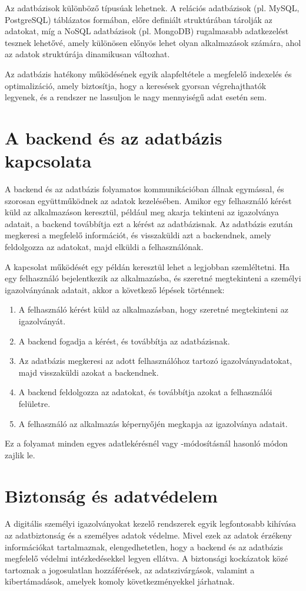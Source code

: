 \documentclass[
]{thesis-ekf}
\theoremstyle{definition}
\theoremstyle{remark}
\begin{document}
	Az adatbázisok különböző típusúak lehetnek. A relációs adatbázisok (pl. MySQL, PostgreSQL) táblázatos formában, előre definiált struktúrában tárolják az adatokat, míg a NoSQL adatbázisok (pl. MongoDB) rugalmasabb adatkezelést tesznek lehetővé, amely különösen előnyös lehet olyan alkalmazások számára, ahol az adatok struktúrája dinamikusan változhat.
	
	Az adatbázis hatékony működésének egyik alapfeltétele a megfelelő indexelés és optimalizáció, amely biztosítja, hogy a keresések gyorsan végrehajthatók legyenek, és a rendszer ne lassuljon le nagy mennyiségű adat esetén sem.
	\section{A backend és az adatbázis kapcsolata}
	A backend és az adatbázis folyamatos kommunikációban állnak egymással, és szorosan együttműködnek az adatok kezelésében. Amikor egy felhasználó kérést küld az alkalmazáson keresztül, például meg akarja tekinteni az igazolványa adatait, a backend továbbítja ezt a kérést az adatbázisnak. Az adatbázis ezután megkeresi a megfelelő információt, és visszaküldi azt a backendnek, amely feldolgozza az adatokat, majd elküldi a felhasználónak.
	
	A kapcsolat működését egy példán keresztül lehet a legjobban szemléltetni. Ha egy felhasználó bejelentkezik az alkalmazásba, és szeretné megtekinteni a személyi igazolványának adatait, akkor a következő lépések történnek:
	
	
	\begin{enumerate}
		\item 	A felhasználó kérést küld az alkalmazásban, hogy szeretné megtekinteni az igazolványát.
		\item 	A backend fogadja a kérést, és továbbítja az adatbázisnak.
		\item 	Az adatbázis megkeresi az adott felhasználóhoz tartozó igazolványadatokat, majd visszaküldi azokat a backendnek.
		\item 	A backend feldolgozza az adatokat, és továbbítja azokat a felhasználói felületre.
		\item 	A felhasználó az alkalmazás képernyőjén megkapja az igazolványa adatait.
	\end{enumerate}
	Ez a folyamat minden egyes adatlekérésnél vagy -módosításnál hasonló módon zajlik le.
	
	\section{Biztonság és adatvédelem}
	A digitális személyi igazolványokat kezelő rendszerek egyik legfontosabb kihívása az adatbiztonság és a személyes adatok védelme. Mivel ezek az adatok érzékeny információkat tartalmaznak, elengedhetetlen, hogy a backend és az adatbázis megfelelő védelmi intézkedésekkel legyen ellátva. A biztonsági kockázatok közé tartoznak a jogosulatlan hozzáférések, az adatszivárgások, valamint a kibertámadások, amelyek komoly következményekkel járhatnak.
	
\end{document}
